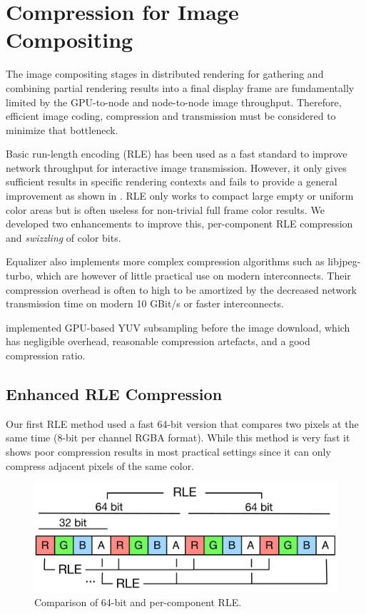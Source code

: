\section{Compression for Image Compositing}

The image compositing stages in distributed rendering for gathering and
combining partial rendering results into a final display frame are fundamentally
limited by the GPU-to-node and node-to-node image throughput. Therefore,
efficient image coding, compression and transmission must be considered to
minimize that bottleneck.

Basic run-length encoding (RLE) has been used as a fast standard to improve
network throughput for interactive image transmission. However, it only gives
sufficient results in specific rendering contexts and fails to provide a general
improvement as shown in \cite{MEP:10}. RLE only works to compact large empty or
uniform color areas but is often useless for non-trivial full frame color
results. We developed two enhancements to improve this, per-component RLE
compression and {\em swizzling} of color bits.

Equalizer also implements more complex compression algorithms such as
\textsf{libjpeg-turbo}, which are however of little practical use on modern
interconnects. Their compression overhead is often to high to be amortized by
the decreased network transmission time on modern 10 GBit/s or faster
interconnects.

\cite{MEP:10} implemented GPU-based YUV subsampling before the image download,
which has negligible overhead, reasonable compression artefacts, and a good
compression ratio.

\subsection{Enhanced RLE Compression}

Our first RLE method used a fast 64-bit version that compares two pixels
at the same time (8-bit per channel RGBA format). While this method is very fast
it shows poor compression results in most practical settings since it can only compress adjacent pixels of the same color.

\begin{figure}
  \includegraphics[width=.618\textwidth]{images/RLE}
  \caption{Comparison of 64-bit and per-component RLE.}
  \label{fRLE}
\end{figure}

